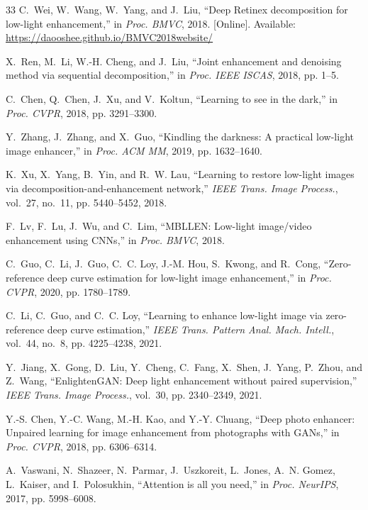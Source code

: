 \documentclass[conference]{IEEEtran}
\begin{document}
\begin{thebibliography}{33}
C.~Wei, W.~Wang, W.~Yang, and J.~Liu, ``Deep Retinex decomposition for low-light enhancement,'' in \emph{Proc. BMVC}, 2018. [Online]. Available: \url{https://daooshee.github.io/BMVC2018website/}

X.~Ren, M.~Li, W.-H. Cheng, and J.~Liu, ``Joint enhancement and denoising method via sequential decomposition,'' in \emph{Proc. IEEE ISCAS}, 2018, pp. 1--5.

C.~Chen, Q.~Chen, J.~Xu, and V.~Koltun, ``Learning to see in the dark,'' in \emph{Proc. CVPR}, 2018, pp. 3291--3300.

Y.~Zhang, J.~Zhang, and X.~Guo, ``Kindling the darkness: A practical low-light image enhancer,'' in \emph{Proc. ACM MM}, 2019, pp. 1632--1640.

K.~Xu, X.~Yang, B.~Yin, and R.~W. Lau, ``Learning to restore low-light images via decomposition-and-enhancement network,'' \emph{IEEE Trans. Image Process.}, vol.~27, no.~11, pp. 5440--5452, 2018.

F.~Lv, F.~Lu, J.~Wu, and C.~Lim, ``MBLLEN: Low-light image/video enhancement using CNNs,'' in \emph{Proc. BMVC}, 2018.

C.~Guo, C.~Li, J.~Guo, C.~C. Loy, J.-M. Hou, S.~Kwong, and R.~Cong, ``Zero-reference deep curve estimation for low-light image enhancement,'' in \emph{Proc. CVPR}, 2020, pp. 1780--1789.

C.~Li, C.~Guo, and C.~C. Loy, ``Learning to enhance low-light image via zero-reference deep curve estimation,'' \emph{IEEE Trans. Pattern Anal. Mach. Intell.}, vol.~44, no.~8, pp. 4225--4238, 2021.

Y.~Jiang, X.~Gong, D.~Liu, Y.~Cheng, C.~Fang, X.~Shen, J.~Yang, P.~Zhou, and Z.~Wang, ``EnlightenGAN: Deep light enhancement without paired supervision,'' \emph{IEEE Trans. Image Process.}, vol.~30, pp. 2340--2349, 2021.

Y.-S. Chen, Y.-C. Wang, M.-H. Kao, and Y.-Y. Chuang, ``Deep photo enhancer: Unpaired learning for image enhancement from photographs with GANs,'' in \emph{Proc. CVPR}, 2018, pp. 6306--6314.

A.~Vaswani, N.~Shazeer, N.~Parmar, J.~Uszkoreit, L.~Jones, A.~N. Gomez, L.~Kaiser, and I.~Polosukhin, ``Attention is all you need,'' in \emph{Proc. NeurIPS}, 2017, pp. 5998--6008.


\end{thebibliography}
\end{document}
